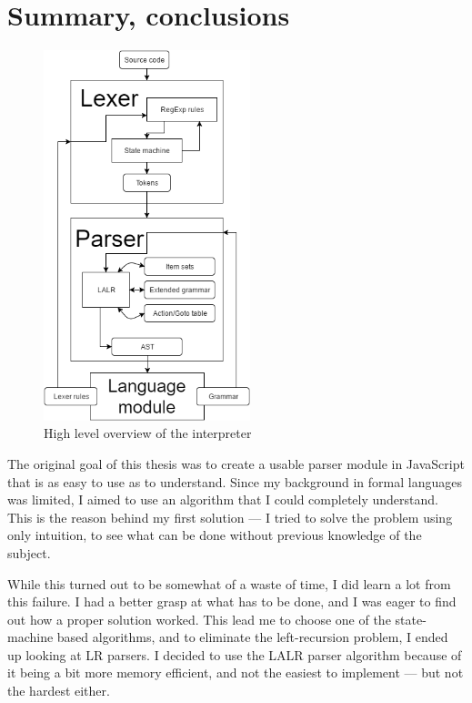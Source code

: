 \chapter{Summary, conclusions}
\begingroup
\setlength{\intextsep}{0pt}%
\setlength{\columnsep}{10pt}%
\begin{figure}
\vspace{-90pt}
\begin{center}
\includegraphics[width=60mm,keepaspectratio]{figures/diagram.png}
\end{center}
\vspace{-15pt}
\caption{High level overview of the interpreter}
\end{figure}

The original goal of this thesis was to create a usable parser module in JavaScript that is as easy to use as to understand. Since my background in formal languages was limited, I aimed to use an algorithm that I could completely understand. This is the reason behind my first solution --- I tried to solve the problem using only intuition, to see what can be done without previous knowledge of the subject.

While this turned out to be somewhat of a waste of time, I did learn a lot from this failure. I had a better grasp at what has to be done, and I was eager to find out how a proper solution worked. This lead me to choose one of the state-machine based algorithms, and to eliminate the left-recursion problem, I ended up looking at LR parsers. I decided to use the LALR parser algorithm because of it being a bit more memory efficient, and not the easiest to implement --- but not the hardest either.

